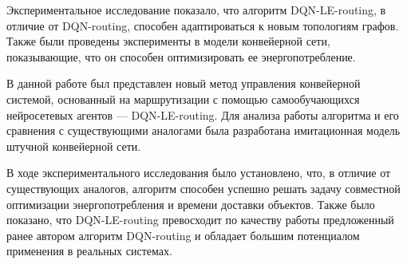 \documentclass[specification,annotation,times]{itmo-student-thesis}
\theoremstyle{definition}
\begin{document}
\chapterconclusion

Экспериментальное исследование показало, что алгоритм DQN-LE-routing, в отличие
от DQN-routing, способен адаптироваться к новым топологиям графов. Также были
проведены эксперименты в модели конвейерной сети, показывающие, что он способен
оптимизировать ее энергопотребление.

\startconclusionpage

В данной работе был представлен новый метод управления конвейерной системой,
основанный на маршрутизации с помощью самообучающихся нейросетевых агентов ---
DQN-LE-routing. Для анализа работы алгоритма и его сравнения с существующими
аналогами была разработана имитационная модель штучной конвейерной сети.

В ходе экспериментального исследования было установлено, что, в отличие от
существующих аналогов, алгоритм способен успешно решать задачу совместной
оптимизации энергопотребления и времени доставки объектов. Также было показано,
что DQN-LE-routing превосходит по качеству работы предложенный ранее автором
алгоритм DQN-routing и обладает большим потенциалом применения в реальных системах.

\printmainbibliography




\end{document}
